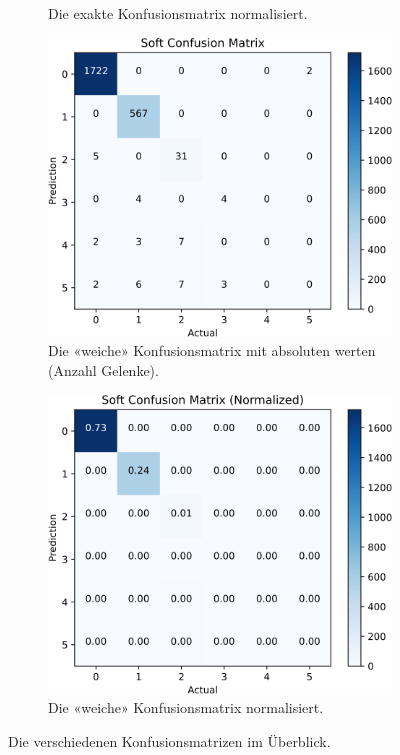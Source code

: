 \begin{figure}[tbh]
\begin{subfigure}{0.45\textwidth}
        \caption{Die exakte Konfusionsmatrix normalisiert.}
    \end{subfigure}
    \par\bigskip
    \begin{subfigure}{0.45\textwidth}
        \includegraphics[width=\linewidth]{pics/soft_confusion_matrix.png}
        \caption{Die «weiche» Konfusionsmatrix mit absoluten werten (Anzahl Gelenke).}
    \end{subfigure}
    \hfill
    \begin{subfigure}{0.45\textwidth}
        \includegraphics[width=\linewidth]{pics/soft_confusion_matrix_norm.png}
        \caption{Die «weiche» Konfusionsmatrix normalisiert.}
    \end{subfigure}
    \caption{Die verschiedenen Konfusionsmatrizen im Überblick.}
    \label{fig:konfusionsmatrizen}
\end{figure}

